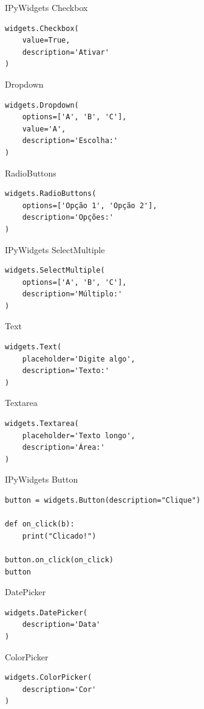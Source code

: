 \documentclass{beamer}
\begin{document}
\begin{frame}[fragile]{IPyWidgets}
Checkbox
\begin{verbatim}
widgets.Checkbox(
    value=True,
    description='Ativar'
)
\end{verbatim}

Dropdown
\begin{verbatim}
widgets.Dropdown(
    options=['A', 'B', 'C'],
    value='A',
    description='Escolha:'
)
\end{verbatim}

RadioButtons
\begin{verbatim}
widgets.RadioButtons(
    options=['Opção 1', 'Opção 2'],
    description='Opções:'
)
\end{verbatim}

\end{frame}

\begin{frame}[fragile]{IPyWidgets}
SelectMultiple
\begin{verbatim}
widgets.SelectMultiple(
    options=['A', 'B', 'C'],
    description='Múltiplo:'
)
\end{verbatim}

Text
\begin{verbatim}
widgets.Text(
    placeholder='Digite algo',
    description='Texto:'
)
\end{verbatim}

Textarea
\begin{verbatim}
widgets.Textarea(
    placeholder='Texto longo',
    description='Área:'
)
\end{verbatim}

\end{frame}

\begin{frame}[fragile]{IPyWidgets}
Button
\begin{verbatim}
button = widgets.Button(description="Clique")

def on_click(b):
    print("Clicado!")

button.on_click(on_click)
button
\end{verbatim}

DatePicker
\begin{verbatim}
widgets.DatePicker(
    description='Data'
)
\end{verbatim}

ColorPicker
\begin{verbatim}
widgets.ColorPicker(
    description='Cor'
)
\end{verbatim}

\end{frame}
\end{document}
